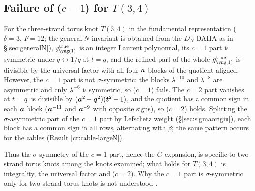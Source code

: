 \subsection{Failure of \texorpdfstring{($c{=}1$)}{(c=1)} for \texorpdfstring{$T(3,4)$}{T(3,4)}}\label{sec:t34}
\begin{result}\label{cr:t34sign}
For the three-strand torus knot $T(3,4)$ in the fundamental representation ($\delta = 3$, $F = 12$; the general-$N$ invariant is obtained from the $D_N$ DAHA as in \S\ref{sec:generalN}), $g^{\mathrm{true}}_{\yone}$ is an integer Laurent polynomial, its $c = 1$ part is symmetric under $q \leftrightarrow 1/q$ at $t = q$, and the refined part of the whole $g^{\mathrm{true}}_{\yone}$ is divisible by the universal factor with all four $\bm{a}$ blocks of the quotient aligned. However, the $c = 1$ part is not $\sigma$-symmetric: the blocks $\lambda^{-10}$ and $\lambda^{-8}$ are asymmetric and only $\lambda^{-6}$ is symmetric, so ($c{=}1$) fails. The $c = 2$ part vanishes at $t = q$, is divisible by $(\bm{a}^2-\bm{q}^2)(\bm{t}^2-1)$, and the quotient has a common sign in each $\bm{a}$ block ($\bm{a}^{-11}$ and $\bm{a}^{-9}$ with opposite signs), so ($c{=}2$) holds. Splitting the $\sigma$-asymmetric part of the $c = 1$ part by Lefschetz weight (\S\ref{sec:sigmaorigin}), each block has a common sign in all rows, alternating with $\beta$; the same pattern occurs for the cables (Result \ref{cr:cable-largeN}).
\end{result}
Thus the $\sigma$-symmetry of the $c = 1$ part, hence the $G$-expansion, is specific to two-strand torus knots among the knots examined; what holds for $T(3,4)$ is integrality, the universal factor and ($c{=}2$). Why the $c = 1$ part is $\sigma$-symmetric only for two-strand torus knots is not understood \open.
